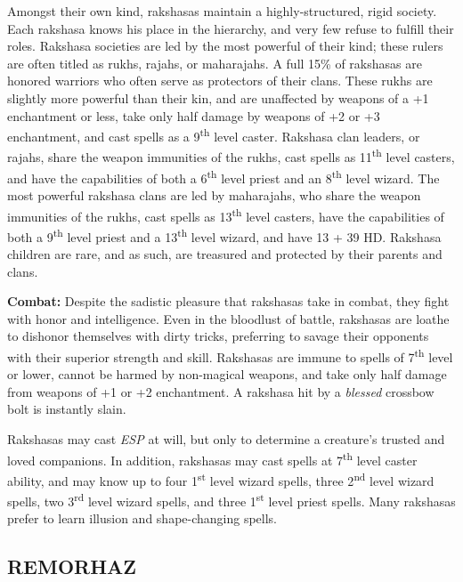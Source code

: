 \begin{multicols}{2}
Amongst their own kind, rakshasas maintain a highly-structured, rigid society. Each rakshasa knows his place in the hierarchy, and very few refuse to fulfill their roles. Rakshasa societies are led by the most powerful of their kind; these rulers are often titled as rukhs, rajahs, or maharajahs. A full 15\% of rakshasas are honored warriors who often serve as protectors of their clans. These rukhs are slightly more powerful than their kin, and are unaffected by weapons of a +1 enchantment or less, take only half damage by weapons of +2 or +3 enchantment, and cast spells as a 9\textsuperscript{th} level caster. Rakshasa clan leaders, or rajahs, share the weapon immunities of the rukhs, cast spells as 11\textsuperscript{th} level casters, and have the capabilities of  both a 6\textsuperscript{th} level priest and an 8\textsuperscript{th} level wizard. The most powerful rakshasa clans are led by maharajahs, who share the weapon immunities of the rukhs, cast spells as 13\textsuperscript{th} level casters, have the capabilities of both a 9\textsuperscript{th} level priest and a 13\textsuperscript{th} level wizard, and have 13 + 39 HD. Rakshasa children are rare, and as such, are treasured and protected by their parents and clans.

\textbf{Combat:} Despite the sadistic pleasure that rakshasas take in combat, they fight with honor and intelligence. Even in the bloodlust of battle, rakshasas are loathe to dishonor themselves with dirty tricks, preferring to savage their opponents with their superior strength and skill. Rakshasas are immune to spells of 7\textsuperscript{th}  level or lower, cannot be harmed by non-magical weapons, and take only half damage from weapons of +1 or +2 enchantment. A rakshasa hit by a \textit{blessed} crossbow bolt is instantly slain.

Rakshasas may cast \textit{ESP} at will, but only to determine a creature's trusted and loved companions. In addition, rakshasas may cast spells at 7\textsuperscript{th} level caster ability, and may know up to four 1\textsuperscript{st} level wizard spells, three 2\textsuperscript{nd} level wizard spells, two 3\textsuperscript{rd} level wizard spells, and three 1\textsuperscript{st} level priest spells. Many rakshasas prefer to learn illusion and shape-changing spells.

\noindent
\begin{minipage}{\columnwidth}

\vspace{1em}

\subsection{REMORHAZ}


\end{minipage}
\end{multicols}
